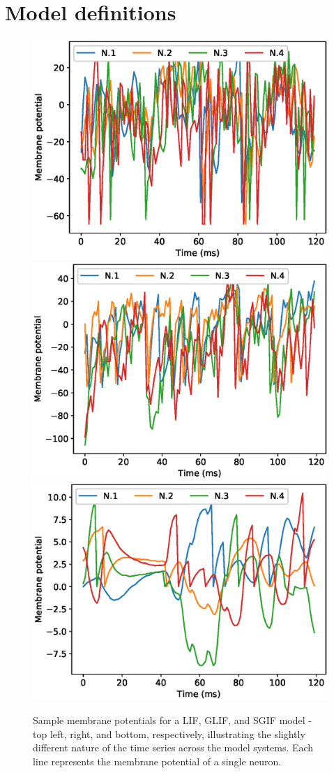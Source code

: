 \documentclass[mphil,deptreport,ianc]{infthesis} %
\begin{document}



\section{Model definitions}

\begin{figure}
    \centering
    \vskip -0.1in
    \includegraphics[width=0.49\columnwidth]{figures/samples/membrane_potentials/export_sample_LIF_white_noise.eps}
    \includegraphics[width=0.49\columnwidth]{figures/samples/membrane_potentials/export_sample_GLIF_white_noise.eps}
    \includegraphics[width=0.49\columnwidth]{figures/samples/membrane_potentials/export_sample_mesoGIF_white_noise.eps}
    \vskip -0.1in
    \caption{Sample membrane potentials for a LIF, GLIF, and SGIF model - top left, right, and bottom, respectively, illustrating the slightly different nature of the time series across the model systems. Each line represents the membrane potential of a single neuron.}
    \label{fig:membrane_potential_samples}
    \vskip -0.2in
\end{figure}
\end{document}
